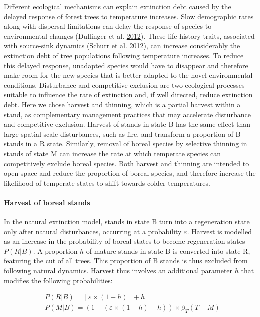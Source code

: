 \documentclass[12pt]{article}
\begin{document}
Different ecological mechanisms can explain extinction debt caused by
the delayed response of forest trees to temperature increases. Slow
demographic rates along with dispersal limitations can delay the
response of species to environmental changes (Dullinger et al.
\protect\hyperlink{ref-Dullinger2012}{2012}). These life-history traits,
associated with source-sink dynamics (Schurr et al.
\protect\hyperlink{ref-Schurr2012}{2012}), can increase considerably the
extinction debt of tree populations following temperature increases. To
reduce this delayed response, unadapted species would have to disappear
and therefore make room for the new species that is better adapted to
the novel environmental conditions. Disturbance and competitive
exclusion are two ecological processes suitable to influence the rate of
extinction and, if well directed, reduce extinction debt. Here we chose
harvest and thinning, which is a partial harvest within a stand, as
complementary management practices that may accelerate disturbance and
competitive exclusion. Harvest of stands in state B has the same effect
than large spatial scale disturbances, such as fire, and transform a
proportion of B stands in a R state. Similarly, removal of boreal
species by selective thinning in stands of state M can increase the rate
at which temperate species can competitively exclude boreal species.
Both harvest and thinning are intended to open space and reduce the
proportion of boreal species, and therefore increase the likelihood of
temperate states to shift towards colder temperatures.

\hypertarget{harvest-of-boreal-stands}{%
\paragraph{Harvest of boreal stands}\label{harvest-of-boreal-stands}}

In the natural extinction model, stands in state B turn into a
regeneration state only after natural disturbances, occurring at a
probability \(\varepsilon\). Harvest is modelled as an increase in the
probability of boreal states to become regeneration states \(P(R|B)\). A
proportion \(h\) of mature stands in state B is converted into state R,
featuring the cut of all trees. This proportion of B stands is thus
excluded from following natural dynamics. Harvest thus involves an
additional parameter \(h\) that modifies the following probabilities:

\begin{equation}
\begin{split}
&P(R|B) = [\varepsilon \times (1 - h)] + h \\[2pt]
&P(M|B) = (1- (\varepsilon \times (1 - h) + h)) \times \beta_T(T + M)
\end{split}
\label{eq:harvestEq}\end{equation}
\end{document}
